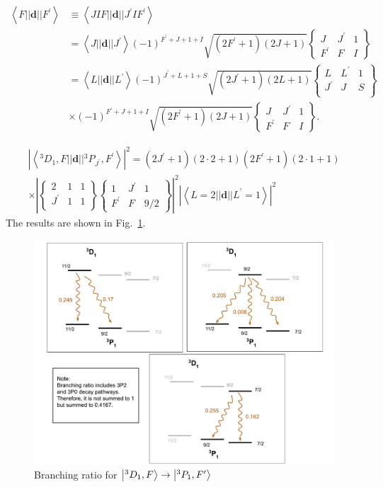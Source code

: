 \documentclass{article}
\begin{document}
$$
\begin{aligned}
\left< F||\mathbf{d}|| F^{\prime}\right> & \equiv\left< J I F||\mathbf{d}|| J^{\prime} I F^{\prime}\right> \\
& = \left< J||\mathbf{d}|| J^{\prime}\right>  (-1)^{F^{\prime}+J+1+I} \sqrt{\left(2 F^{\prime}+1\right)(2 J+1)}\left\lbrace\begin{array}{ccc}
J & J^{\prime} & 1 \\
F^{\prime} & F & I
\end{array}\right\rbrace \\
& = \left< L||\mathbf{d}|| L^{\prime}\right>(-1)^{J^{\prime}+L+1+S} \sqrt{\left(2 J^{\prime}+1\right)(2 L+1)}\left\lbrace\begin{array}{ccc}
L & L^{\prime} & 1 \\
J^{\prime} & J & S \\
\end{array}\right\rbrace \\
& \times (-1)^{F^{\prime}+J+1+I} \sqrt{\left(2 F^{\prime}+1\right)(2 J+1)}\left\lbrace\begin{array}{ccc}
J & J^{\prime} & 1 \\
F^{\prime} & F & I
\end{array}\right\rbrace .
\end{aligned}
$$

$$\begin{gathered}
\left| \left< {}^{3}{D}_{1}, F||\mathbf{d}|| {}^3{P}_{J^{\prime}}, F^{\prime} \right> \right|^2 = (2J^{\prime} + 1)(2 \cdot 2 + 1)(2F^{\prime} + 1)(2 \cdot 1 + 1) \\
\times \left|
   \left\lbrace\begin{array}{ccc}
2 & 1 & 1 \\
J^{\prime} & 1 & 1 \\
\end{array}\right\rbrace
\left\lbrace\begin{array}{ccc}
1 & J^{\prime} & 1 \\
F^{\prime} & F & 9/2
\end{array}\right\rbrace\right|^2  \left| \left< L=2||\mathbf{d}|| L^{\prime}=1\right> \right|^2
\end{gathered}$$
The results are shown in Fig.~\ref{fig:hyperfine_branching}.

\begin{figure}[h]
    \centering
    \includegraphics[width=\textwidth]{hyperfine_branching.pdf}
    \caption{Branching ratio for $\ket{^{3}D_1, F} \rightarrow \ket{^3P_1, F'}$  \label{fig:hyperfine_branching}}
\end{figure} \clearpage



\end{document}
